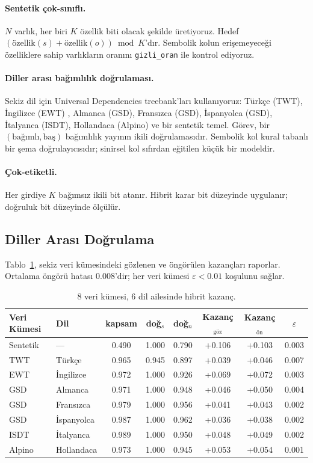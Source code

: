 \documentclass[11pt,a4paper]{article}
\begin{document}
\paragraph{Sentetik çok-sınıflı.}
$N$ varlık, her biri $K$ özellik biti olacak şekilde üretiyoruz.
Hedef $(\text{özellik}(s) + \text{özellik}(o)) \bmod K$'dır.
Sembolik kolun erişemeyeceği özelliklere sahip varlıkların oranını
\texttt{gizli\_oran} ile kontrol ediyoruz.

\paragraph{Diller arası bağımlılık doğrulaması.}
Sekiz dil için Universal Dependencies \cite{nivre2020ud} treebank'ları
kullanıyoruz: Türkçe (TWT), İngilizce (EWT) \cite{silveira2014gold},
Almanca (GSD), Fransızca (GSD), İspanyolca (GSD), İtalyanca (ISDT),
Hollandaca (Alpino) ve bir sentetik temel. Görev, bir
$(\text{bağımlı}, \text{baş})$ bağımlılık yayının ikili
doğrulamasıdır. Sembolik kol kural tabanlı bir şema doğrulayıcısıdır;
sinirsel kol sıfırdan eğitilen küçük bir modeldir.

\paragraph{Çok-etiketli.}
Her girdiye $K$ bağımsız ikili bit atanır. Hibrit karar bit düzeyinde
uygulanır; doğruluk bit düzeyinde ölçülür.

\subsection{Diller Arası Doğrulama}
\label{sec:diller_arasi}
Tablo~\ref{tab:8dil}, sekiz veri kümesindeki gözlenen ve öngörülen
kazançları raporlar. Ortalama öngörü hatası $0.008$'dir; her veri
kümesi $\varepsilon < 0.01$ koşulunu sağlar.

\begin{table}[ht]
\centering
\caption{8 veri kümesi, 6 dil ailesinde hibrit kazanç.}
\label{tab:8dil}
\small
\begin{tabular}{llcccccc}
\toprule
Veri Kümesi & Dil & kapsam & doğ$_s$ & doğ$_n$ & Kazanç$_\text{göz}$ & Kazanç$_\text{ön}$ & $\varepsilon$ \\
\midrule
Sentetik & --- & 0.490 & 1.000 & 0.790 & +0.106 & +0.103 & 0.003 \\
TWT & Türkçe & 0.965 & 0.945 & 0.897 & +0.039 & +0.046 & 0.007 \\
EWT & İngilizce & 0.972 & 1.000 & 0.926 & +0.069 & +0.072 & 0.003 \\
GSD & Almanca & 0.971 & 1.000 & 0.948 & +0.046 & +0.050 & 0.004 \\
GSD & Fransızca & 0.979 & 1.000 & 0.956 & +0.041 & +0.043 & 0.002 \\
GSD & İspanyolca & 0.987 & 1.000 & 0.962 & +0.036 & +0.038 & 0.002 \\
ISDT & İtalyanca & 0.989 & 1.000 & 0.950 & +0.048 & +0.049 & 0.002 \\
Alpino & Hollandaca & 0.973 & 1.000 & 0.945 & +0.053 & +0.054 & 0.001 \\
\bottomrule
\end{tabular}
\end{table}
\end{document}
